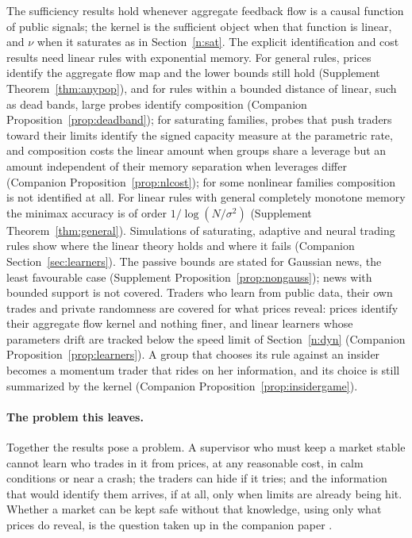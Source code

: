 \documentclass[12pt]{article}
\theoremstyle{definition}
\theoremstyle{remark}
\begin{document}
The sufficiency results hold whenever aggregate feedback flow is a causal function of public signals; the kernel is the sufficient object when that function is linear, and $\nu$ when it saturates as in Section~\ref{n:sat}. The explicit identification and cost results need linear rules with exponential memory. For general rules, prices identify the aggregate flow map and the lower bounds still hold (Supplement Theorem~\ref{thm:anypop}), and for rules within a bounded distance of linear, such as dead bands, large probes identify composition (Companion Proposition~\ref{prop:deadband}); for saturating families, probes that push traders toward their limits identify the signed capacity measure at the parametric rate, and composition costs the linear amount when groups share a leverage but an amount independent of their memory separation when leverages differ (Companion Proposition~\ref{prop:nlcost}); for some nonlinear families composition is not identified at all. For linear rules with general completely monotone memory the minimax accuracy is of order $1/\log(N/\sigma^2)$ (Supplement Theorem~\ref{thm:general}). Simulations of saturating, adaptive and neural trading rules show where the linear theory holds and where it fails (Companion Section~\ref{sec:learners}). The passive bounds are stated for Gaussian news, the least favourable case (Supplement Proposition~\ref{prop:nongauss}); news with bounded support is not covered. Traders who learn from public data, their own trades and private randomness are covered for what prices reveal: prices identify their aggregate flow kernel and nothing finer, and linear learners whose parameters drift are tracked below the speed limit of Section~\ref{n:dyn} (Companion Proposition~\ref{prop:learners}). A group that chooses its rule against an insider becomes a momentum trader that rides on her information, and its choice is still summarized by the kernel (Companion Proposition~\ref{prop:insidergame}).

\paragraph{The problem this leaves.} Together the results pose a problem. A supervisor who must keep a market stable cannot learn who trades in it from prices, at any reasonable cost, in calm conditions or near a crash; the traders can hide if it tries; and the information that would identify them arrives, if at all, only when limits are already being hit. Whether a market can be kept safe without that knowledge, using only what prices do reveal, is the question taken up in the companion paper \citep{niroula2026b}.
\end{document}
